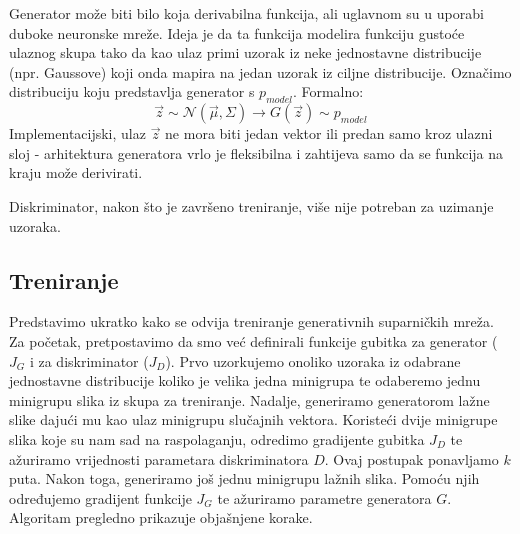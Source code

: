 Generator može biti bilo koja derivabilna funkcija, ali uglavnom su u uporabi duboke neuronske mreže. Ideja je da ta funkcija modelira funkciju gustoće ulaznog skupa tako da kao ulaz primi uzorak iz neke jednostavne distribucije (npr. Gaussove) koji onda mapira na jedan uzorak iz ciljne distribucije. Označimo distribuciju koju predstavlja generator s $p_{model}$. Formalno:
\begin{equation*}
	\vec{z} \sim \mathcal{N}(\vec{\mu}, \Sigma) \rightarrow G(\vec{z}) \sim p_{model}
\end{equation*}
Implementacijski, ulaz $\vec{z}$ ne mora biti jedan vektor ili predan samo kroz ulazni sloj - arhitektura generatora vrlo je fleksibilna i zahtijeva samo da se funkcija na kraju može derivirati.

Diskriminator, nakon što je završeno treniranje, više nije potreban za uzimanje uzoraka.

\subsection{Treniranje}
Predstavimo ukratko kako se odvija treniranje generativnih suparničkih mreža. Za početak, pretpostavimo da smo već definirali funkcije gubitka za generator ($J_G$ i za diskriminator ($J_D$). Prvo uzorkujemo onoliko uzoraka iz odabrane jednostavne distribucije koliko je velika jedna minigrupa te odaberemo jednu minigrupu slika iz skupa za treniranje. Nadalje, generiramo generatorom lažne slike dajući mu kao ulaz minigrupu slučajnih vektora. Koristeći dvije minigrupe slika koje su nam sad na raspolaganju, odredimo gradijente gubitka $J_D$ te ažuriramo vrijednosti parametara diskriminatora $D$. Ovaj postupak ponavljamo $k$ puta. Nakon toga, generiramo još jednu minigrupu lažnih slika. Pomoću njih određujemo gradijent funkcije $J_G$ te ažuriramo parametre generatora $G$. Algoritam  pregledno prikazuje objašnjene korake.

